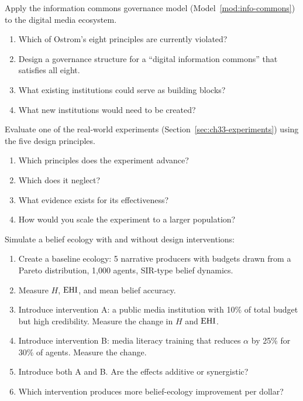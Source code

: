 \begin{exercise}
Apply the information commons governance model (Model~\ref{mod:info-commons}) to the digital media ecosystem.
\begin{enumerate}[nosep]
  \item Which of Ostrom's eight principles are currently violated?
  \item Design a governance structure for a ``digital information commons'' that satisfies all eight.
  \item What existing institutions could serve as building blocks?
  \item What new institutions would need to be created?
\end{enumerate}
\end{exercise}

\begin{exercise}
Evaluate one of the real-world experiments (Section~\ref{sec:ch33-experiments}) using the five design principles.
\begin{enumerate}[nosep]
  \item Which principles does the experiment advance?
  \item Which does it neglect?
  \item What evidence exists for its effectiveness?
  \item How would you scale the experiment to a larger population?
\end{enumerate}
\end{exercise}

\begin{exercise}[Computational]
Simulate a belief ecology with and without design interventions:
\begin{enumerate}[nosep]
  \item Create a baseline ecology: 5 narrative producers with budgets drawn from a Pareto distribution, 1,000 agents, SIR-type belief dynamics.
  \item Measure $H$, $\mathrm{EHI}$, and mean belief accuracy.
  \item Introduce intervention A: a public media institution with 10\% of total budget but high credibility. Measure the change in $H$ and $\mathrm{EHI}$.
  \item Introduce intervention B: media literacy training that reduces $\alpha$ by 25\% for 30\% of agents. Measure the change.
  \item Introduce both A and B. Are the effects additive or synergistic?
  \item Which intervention produces more belief-ecology improvement per dollar?
\end{enumerate}
\end{exercise}
